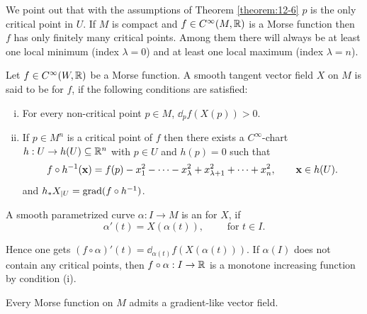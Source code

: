 We point out that with the assumptions of Theorem \ref{theorem:12-6} $p$ is the only critical
point in $U$. If $M$ is compact and $f\in C^\infty(M, {\mathbb{R}})$ is a Morse function then $f$ has
only finitely many critical points. Among them there will always be at least one
local minimum (index $\lambda = 0$) and at least one local maximum (index $\lambda=n$).

\begin{definition}\label{definition:12-7}
  Let $f\in C^\infty(W, {\mathbb{R}})$ be a Morse function. A smooth tangent
vector field $X$ on $M$ is said to be  for $f$, if the following conditions
are satisfied:
\begin{enumerate}[(i)]
  \item For every non-critical point $p\in M$, $\dd_pf(X(p)) > 0$.
  \item If $p\in M^n$ is a critical point of $f$ then there exists a $C^\infty$-chart $h:U\to h(U)\subseteq{\ensuremath{\mathbb{R}}}^n$
  with $p\in U$ and $h(p) = 0$ such that
  \[
    f\circ h^{-1}(\mathbf{x}) = f(p) - x_1^2 - \cdots - x_\lambda^2 + x_{\lambda+1}^2 + \cdots + x_n^2, \qquad \mathbf{x}\in h(U).
  \]
  and $h_*X_{|U} = \operatorname{grad}(f\circ h^{-1})$.
\end{enumerate}
\end{definition}

A smooth parametrized curve $\alpha:I\to M$ is an  for $X$, if
\[
  \alpha'(t) = X(\alpha(t)),\qquad \text{ for } t\in I.
\]

Hence one gets $(f\circ\alpha)'(t) = \dd_{\alpha(t)}f(X(\alpha(t)))$. If $\alpha(I)$ does not contain any
critical points, then $f\circ\alpha:I\to{\ensuremath{\mathbb{R}}}$ is a monotone increasing function by condition (i).

\begin{lemma}\label{lemma:12-8}
  Every Morse function on $M$ admits a gradient-like vector field.
\end{lemma}


